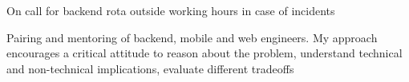 \begin{cventries}
{\begin{cvitems}
    \item On call for backend rota outside working hours in case of incidents 
 \item Pairing and mentoring of backend, mobile and web engineers. My approach encourages a critical attitude to reason about the problem, understand technical and non-technical implications, evaluate different tradeoffs 
	\end{cvitems}
}


\end{cventries}
